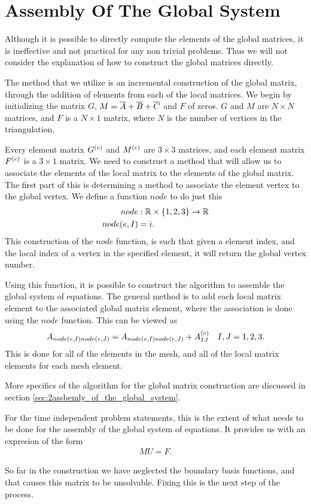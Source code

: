 \documentclass[../fem.tex]{subfile}
\begin{document}
\section{Assembly Of The Global System}%
\label{sec:assembly_of_the_global_system}

Although it is possible to directly compute the elements of the global
matrices, it is ineffective and not practical for any non trivial problems.
Thus we will not consider the explanation of how to construct the global
matrices directly.

The method that we utilize is an incremental construction of the global matrix,
through the addition of elements from each of the local matrices. We begin by
initializing the matrix $G$, $M=\overline{A}+\overline{B}+\overline{C}$ and $F$ of zeros. $G$ and
$M$ are $N\times N$ matrices, and $F$ is a $N\times 1$ matrix, where $N$ is the
number of vertices in the triangulation.

Every element matrix $G^{(e)}$ and $M^{(e)}$ are $3\times 3$ matrices, and each element matrix
$F^{(e)}$ is a $3\times 1$ matrix. We need to construct a method that will allow
us to associate the elements of the local matrix to the elements of the global
matrix. The first part of this is determining a method to associate the element
vertex to the global vertex. We define a function $node$ to do just this
\begin{align*}
  node&:\mathbb{R}\times\{1,2,3\}\rightarrow\mathbb{R}\\
  node(e,I)&=i.
\end{align*}
This construction of the $node$ function, is such that given a element index,
and the local index of a vertex in the specified element, it will return the
global vertex number.

Using this function, it is possible to construct the algorithm to assemble the
global system of equations. The general method is to add each local matrix
element to the associated global matrix element, where the association is done
using the $node$ function. This can be viewed as
\begin{align*}
  A_{node(e,I)node(e,J)}=A_{node(e,I)node(e,J)}+A^{(e)}_{IJ}\quad I,J=1,2,3.
\end{align*}
This is done for all of the elements in the mesh, and all of the local matrix
elements for each mesh element.

More specifics of the algorithm for the global matrix construction are
discussed in section \ref{sec:2assbemly_of_the_global_system}.

For the time independent problem statements, this is the extent of what needs
to be done for the assembly of the global system of equations. It provides us
with an expresion of the form
\begin{align*}
   MU=F.
\end{align*}

So far in the construction we have neglected the boundary basis functions, and
that causes this matrix to be unsolvable. Fixing this is the next step of the
process.
\end{document}
